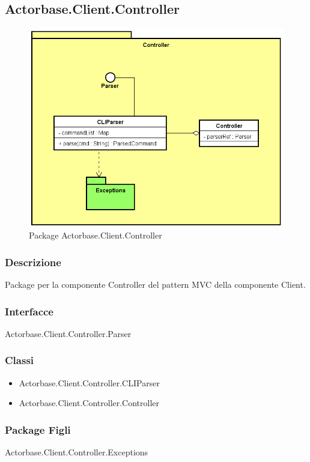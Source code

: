 \documentclass[a4paper]{article}
\begin{document}
		\subsection{Actorbase.Client.Controller}
			\begin{figure} [H]
				\centering
				\includegraphics[scale=0.6]{ST/Client/ControllerSemplificato.png}
   		     	\caption{Package Actorbase.Client.Controller}
			\end{figure}
			
			\subsubsection{Descrizione}
				Package per la componente Controller del pattern MVC della componente Client.
			\subsubsection{Interfacce}
				Actorbase.Client.Controller.Parser
			\subsubsection{Classi}
				\begin{itemize}
					\item Actorbase.Client.Controller.CLIParser
					\item Actorbase.Client.Controller.Controller		
				\end{itemize}
			\subsubsection{Package Figli}
				Actorbase.Client.Controller.Exceptions
\end{document}
